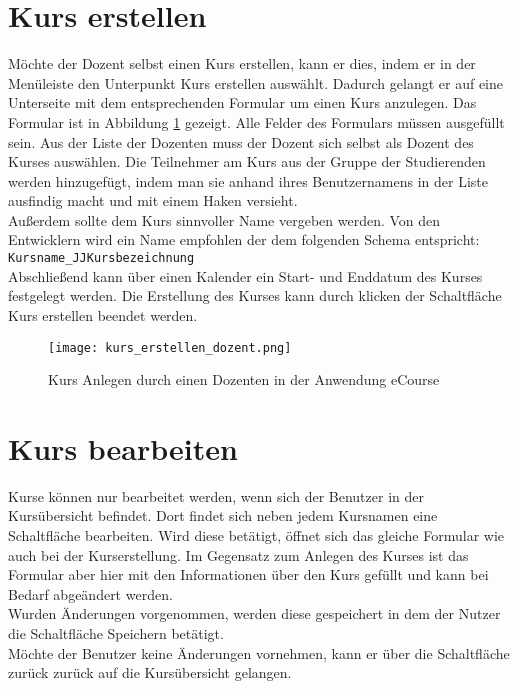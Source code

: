 \section{Kurs erstellen}
Möchte der Dozent selbst einen Kurs erstellen, kann er dies, indem er in der Menüleiste den Unterpunkt \glqq Kurs erstellen\grqq{} auswählt. Dadurch gelangt er auf eine Unterseite mit dem entsprechenden Formular um einen Kurs anzulegen. Das Formular ist in Abbildung \ref{fib:kurs_anlegen} gezeigt. Alle Felder des Formulars müssen ausgefüllt sein. Aus der Liste der Dozenten muss der Dozent sich selbst als Dozent des Kurses auswählen.
Die Teilnehmer am Kurs aus der Gruppe der Studierenden werden hinzugefügt, indem man sie anhand ihres Benutzernamens in der Liste ausfindig macht und mit einem Haken versieht. \\
Außerdem sollte dem Kurs sinnvoller Name vergeben werden. Von den Entwicklern wird ein Name empfohlen der dem folgenden Schema entspricht: \\
\verb/Kursname_JJKursbezeichnung/\\
Abschließend kann über einen Kalender ein Start- und Enddatum des Kurses festgelegt werden. 
Die Erstellung des Kurses kann durch klicken der Schaltfläche \glqq Kurs erstellen\grqq{} beendet werden.

\begin{figure}[h]
\centering
\texttt{[image: kurs\_erstellen\_dozent.png]}
\caption{Kurs Anlegen durch einen Dozenten in der Anwendung eCourse}
\label{fib:kurs_anlegen}
\end{figure}
\section{Kurs bearbeiten}
Kurse können nur bearbeitet werden, wenn sich der Benutzer in der Kursübersicht befindet. Dort findet sich neben jedem Kursnamen eine Schaltfläche \glqq bearbeiten\grqq . Wird diese betätigt, öffnet sich das gleiche Formular wie auch bei der Kurserstellung. Im Gegensatz zum Anlegen des Kurses ist das Formular aber hier mit den Informationen über den Kurs gefüllt und kann bei Bedarf abgeändert werden.\\
Wurden Änderungen vorgenommen, werden diese gespeichert in dem der Nutzer die Schaltfläche \glqq Speichern\grqq{} betätigt.\\
Möchte der Benutzer keine Änderungen vornehmen, kann er über die Schaltfläche \glqq zurück\grqq{} zurück auf die Kursübersicht gelangen.


